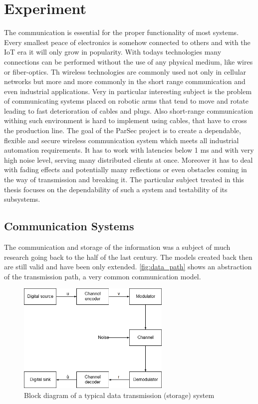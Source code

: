 \chapter{Experiment}

The communication is essential for the proper functionality of most systems. Every smallest peace of electronics is somehow connected to others and with the IoT era it will only grow in popularity. With todays technologies many connections can be performed without the use of any physical medium, like wires or fiber-optics. Th wireless technologies are commonly used not only in cellular networks but more and more commonly in the short range communication and even industrial applications. Very in particular interesting subject is the problem of communicating systems placed on robotic arms that tend to move and rotate leading to fast deterioration of cables and plugs. Also short-range communication withing such environment is hard to implement using cables, that have to cross the production line. 
The goal of the ParSec project is to create a dependable, flexible and secure wireless communication system which meets all industrial automation requirements. It has to work with latencies below 1 ms and with very high noise level, serving many distributed clients at once. Moreover it has to deal with fading effects and potentially many reflections or even obstacles coming in the way of transmission and breaking it. The particular subject treated in this thesis focuses on the dependability of such a system and testability of its subsystems.

\section{Communication Systems}
The communication and storage of the information was a subject of much research going back to the half of the last century. The models created back then are still valid and have been only extended. \autoref{fig:data_path} shows an abstraction of the transmission path, a very common communication model.
\begin{figure}[H]
\centering
\includegraphics[width=0.65\textwidth]{figures/Data_transmission_path.png}
\caption{Block diagram of a typical data transmission (storage) system~\cite{book:LinCostello}}
\label{fig:data_path}
\end{figure}

